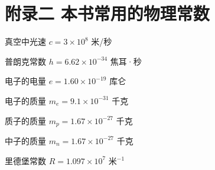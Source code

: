 \chapter{附录二
本书常用的物理常数}

真空中光速 \(c = 3 \times 10^{8}\) 米/秒

普朗克常数 \(h = 6.62 \times 10^{-34}\) 焦耳·秒

电子的电量 \(e = 1.60 \times 10^{-19}\) 库仑

电子的质量 \(m_{e} = 9.1 \times 10^{-31}\) 千克

质子的质量 \(m_{p} = 1.67 \times 10^{-27}\) 千克

中子的质量 \(m_{n} = 1.67 \times 10^{-27}\) 千克

里德堡常数 \(R = 1.097 \times 10^{7}\) 米\(^{-1}\)
